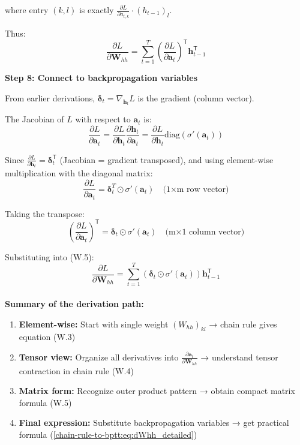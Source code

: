 \begin{notechapter}
where entry $(k,l)$ is exactly $\frac{\partial L}{\partial a_{t,k}} \cdot
(h_{t-1})_l$.

Thus:
\[
\frac{\partial L}{\partial \mathbf{W}_{hh}} =
\sum_{t=1}^{T} \left(\frac{\partial L}{\partial \mathbf{a}_t}\right)^\mathsf{T} \mathbf{h}_{t-1}^\mathsf{T}
\tag{W.5}
\]

\vspace{1em}
\textbf{Step 8: Connect to backpropagation variables}
\vspace{1em}

From earlier derivations, $\bm{\delta}_t = \nabla_{\mathbf{h}_t} L$ is the
gradient (column vector).

The Jacobian of $L$ with respect to $\mathbf{a}_t$ is:
\[
    \frac{\partial L}{\partial \mathbf{a}_t} =
    \frac{\partial L}{\partial \mathbf{h}_t}
    \frac{\partial \mathbf{h}_t}{\partial \mathbf{a}_t} =
    \frac{\partial L}{\partial \mathbf{h}_t} \text{diag}(\sigma'(\mathbf{a}_t))
\]

Since $\frac{\partial L}{\partial \mathbf{h}_t} = \bm{\delta}_t^\mathsf{T}$ (Jacobian =
gradient transposed), and using element-wise multiplication with the diagonal
matrix:
\[
    \frac{\partial L}{\partial \mathbf{a}_t} =
    \bm{\delta}_{t}^{T} \odot \sigma'(\mathbf{a}_t)
    \quad \text{(1×m row vector)}
\]

Taking the transpose:
\[
    \left(\frac{\partial L}{\partial \mathbf{a}_t}\right)^\mathsf{T} =
    \bm{\delta}_{t} \odot \sigma'(\mathbf{a}_t)
    \quad \text{(m×1 column vector)}
\]

Substituting into (W.5):
\begin{equation}
\boxed{\frac{\partial L}{\partial \mathbf{W}_{hh}} =
\sum_{t=1}^{T} (\bm{\delta}_t \odot \sigma'(\mathbf{a}_t)) 
\mathbf{h}_{t-1}^\mathsf{T}}
\label{chain-rule-to-bptt:eq:dWhh_detailed}
\end{equation}
\\
\textbf{Summary of the derivation path:}
\begin{enumerate}
    \item \textbf{Element-wise:} Start with single weight $(W_{hh})_{kl}$ → chain rule gives equation (W.3)
    \item \textbf{Tensor view:} Organize all derivatives into $\frac{\partial \mathbf{a}_t}{\partial \mathbf{W}_{hh}}$ → understand tensor contraction in chain rule (W.4)
    \item \textbf{Matrix form:} Recognize outer product pattern → obtain compact matrix formula (W.5)
    \item \textbf{Final expression:} Substitute backpropagation variables → get practical formula (\ref{chain-rule-to-bptt:eq:dWhh_detailed})
\end{enumerate}


\end{notechapter}
